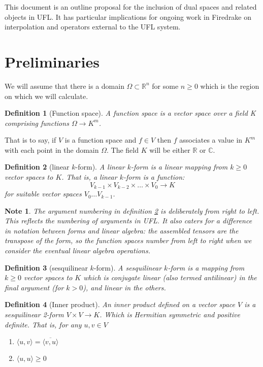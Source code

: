 \documentclass[a4paper,11pt]{article}
\newtheorem{definition}{Definition}[section]
\newtheorem{note}{Note}[section]
\begin{document}
This document is an outline proposal for the inclusion of dual spaces and related objects in UFL. It has particular implications for ongoing work in Firedrake on interpolation and operators external to the UFL system.

\section{Preliminaries}

We will assume that there is a domain $\Omega \subset \mathbb{R}^n$ for some $n\ge0$ which is the region on which we will calculate.

\begin{definition}[Function space]
    A \emph{function space} is a vector space over a field K comprising functions $\Omega\rightarrow K^m$.
\end{definition}
That is to say, if $V$ is a function space and $f\in V$ then $f$ associates a value in $K^m$ with each point in the domain $\Omega$. The field $K$ will be either $\mathbb{R}$ or $\mathbb{C}$. 

\begin{definition}[linear $k$-form]\label{kform}
    A \emph{linear $k$-form} is a linear mapping from $k\ge0$ vector spaces to $K$. That is, a linear $k$-form is a function:
    \begin{equation} 
    V_{k-1} \times V_{k-2} \times \ldots \times V_{0} \rightarrow K
    \end{equation} 
    for suitable vector spaces $V_0\ldots V_{k-1}$. 
\end{definition}

\begin{note}
    The argument numbering in definition \ref{kform} is deliberately from right to left. This reflects the numbering of arguments in UFL. It also caters for a difference in notation between forms and linear algebra: the assembled tensors are the transpose of the form, so the function spaces number from left to right when we consider the eventual linear algebra operations.
\end{note}

\begin{definition}[sesquilinear $k$-form]
    A \emph{sesquilinear $k$-form} is a mapping from $k\ge0$ vector spaces to $K$ which is conjugate linear (also termed antilinear) in the final argument (for $k>0$), and linear in the others. 
\end{definition}

\begin{definition}[Inner product]
    An inner product defined on a vector space $V$ is a sesquilinear 2-form $V\times V\rightarrow K$. Which is Hermitian symmetric and positive definite. That is, for any $u, v \in V$
    \begin{enumerate}
        \item $\langle u, v\rangle = \overline{\langle v, u \rangle}$
        \item $\langle u, u\rangle \geq 0$
    \end{enumerate}
\end{definition}
\end{document}
